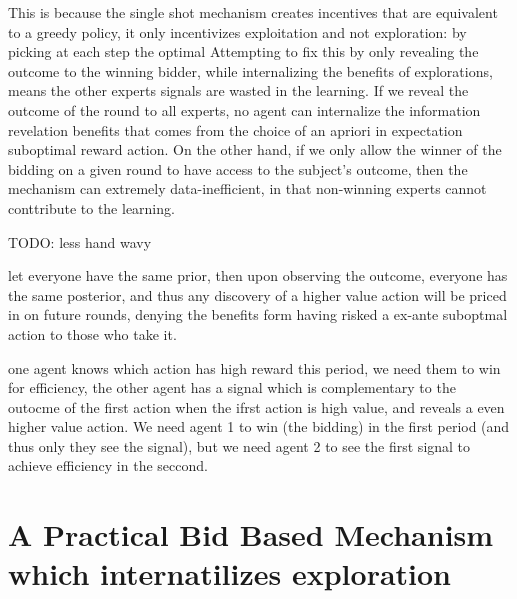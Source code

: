 This is because the single shot mechanism creates incentives that are equivalent to a greedy policy, it only incentivizes exploitation and not exploration: by picking at each step the optimal 
Attempting to fix this by only revealing the outcome to the winning bidder, while internalizing the benefits of explorations, means the other experts signals are wasted in the learning. 
If we reveal the outcome of the round to all experts,  no agent can internalize the information revelation benefits that comes from the choice of an apriori in expectation suboptimal reward action. On the other hand, if we only allow the winner of the bidding on a given round to have access to the subject's outcome, then the mechanism can extremely data-inefficient, in that non-winning experts cannot conttribute to the learning.


TODO: less hand wavy
\begin{eg}
let everyone have the same prior, then upon observing the outcome, everyone has the same posterior, and thus any discovery of a higher value action will be priced in on future rounds, denying the benefits form having risked a ex-ante suboptmal action to those who take it. 
\end{eg}

\begin{eg}
one agent knows which action has high reward this period, we need them to win for efficiency, the other agent has a signal which is complementary to the outocme of the first action when the ifrst action is high value, and reveals a even higher value action. We need agent 1 to win (the bidding) in the first period (and thus only they see the signal), but we need agent 2 to see the first signal to achieve efficiency in the seccond.
\end{eg}

\section{A Practical Bid Based Mechanism which internatilizes exploration}


